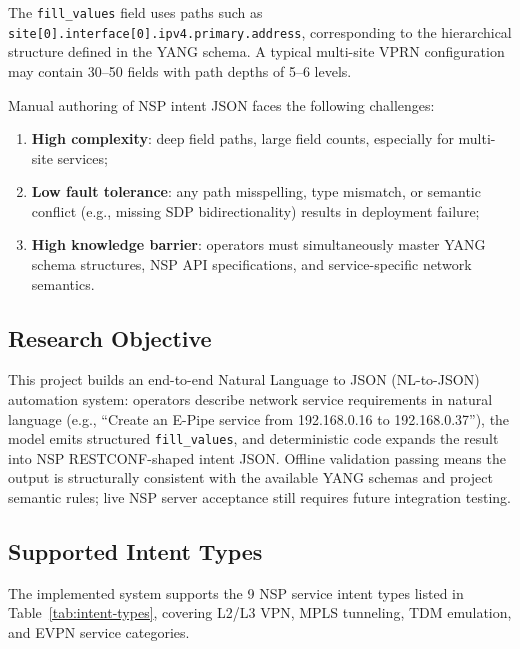 \documentclass[12pt, a4paper]{article}
\newcommand{\yang}{\textsc{YANG}}
\newcommand{\nsp}{\textsc{NSP}}
\newcommand{\fillvalues}{\texttt{fill\_values}}
\begin{document}
\noindent
The \fillvalues{} field uses paths such as \texttt{site[0].interface[0].ipv4.primary.address}, corresponding to the hierarchical structure defined in the \yang{} schema. A typical multi-site VPRN configuration may contain 30--50 fields with path depths of 5--6 levels.

Manual authoring of \nsp{} intent JSON faces the following challenges:

\begin{enumerate}
  \item \textbf{High complexity}: deep field paths, large field counts, especially for multi-site services;
  \item \textbf{Low fault tolerance}: any path misspelling, type mismatch, or semantic conflict (e.g., missing SDP bidirectionality) results in deployment failure;
  \item \textbf{High knowledge barrier}: operators must simultaneously master \yang{} schema structures, \nsp{} API specifications, and service-specific network semantics.
\end{enumerate}

\subsection{Research Objective}

This project builds an end-to-end Natural Language to JSON (NL-to-JSON) automation system: operators describe network service requirements in natural language (e.g., ``Create an E-Pipe service from 192.168.0.16 to 192.168.0.37''), the model emits structured \fillvalues{}, and deterministic code expands the result into NSP RESTCONF-shaped intent JSON. Offline validation passing means the output is structurally consistent with the available \yang{} schemas and project semantic rules; live NSP server acceptance still requires future integration testing.

\subsection{Supported Intent Types}

The implemented system supports the 9 \nsp{} service intent types listed in Table~\ref{tab:intent-types}, covering L2/L3 VPN, MPLS tunneling, TDM emulation, and EVPN service categories.
\end{document}

